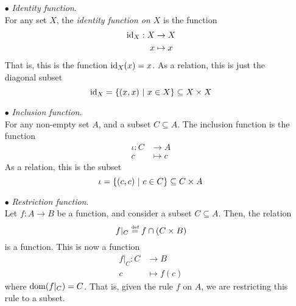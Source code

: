 \vspace*{1em}

\begin{example}\hfill
\begin{itemize}
\item[$\bullet$] \emph{Identity function}.\\[0.5em]
For any set $X$, the \emph{identity function on $X$} is the function
\begin{align*}
\operatorname{id}_X: X &\to X\\
 x&\mapsto x
\end{align*}
That is, this is the function $\operatorname{id}_X(x) = x$. As a relation, this is just the diagonal subset
\[\operatorname{id}_X = \left\{(x,x)\ \vert\ x \in X\right\} \subseteq X \times X\]

\item[$\bullet$] \emph{Inclusion function}.\\[0.5em]
For any non-empty set $A$, and a subset $C \subseteq A$. The inclusion function is the function
\begin{align*}
\iota : C &\to A\\
 c&\mapsto c
\end{align*}
As a relation, this is the subset
\[\iota = \left\{(c,c)\ \vert\ c \in C\right\} \subseteq C \times A\]

\item[$\bullet$] \emph{Restriction function}.\\[0.5em]
Let $f:A \to B$ be a function, and consider a subset $C \subseteq A$. Then, the relation
\[f\vert_C \overset{\text{\tiny def}}{=} f \cap (C \times B)\]
is a function. This is now a function 
\begin{align*}
f\vert_C : C &\to B\\
 c&\mapsto f(c)
\end{align*}
where $\operatorname{dom}(f\vert_C) = C$. That is, given the rule $f$ on $A$, we are restricting this rule to a subset.
\end{itemize}
\end{example}

\vspace*{1em}

